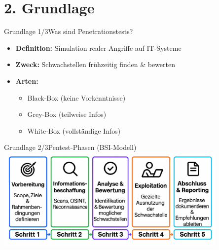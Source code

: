 \documentclass[
	aspectratio=169,	%
	onlytextwidth,		%
	t,					%
	]{beamer}
\begin{document}
\section{2. Grundlage}
\begin{frame}{Grundlage 1/3}{Was sind Penetrationstests?}
	\begin{itemize}
		\item \textbf{Definition:} Simulation realer Angriffe auf IT-Systeme
		
		\vspace{2mm}
		\item \textbf{Zweck:} Schwachstellen frühzeitig finden \&  bewerten
		\vspace{2mm}
		\item \textbf{Arten:}
		\begin{itemize}
			\item Black-Box (keine Vorkenntnisse)
			\item Grey-Box (teilweise Infos)
			\item White-Box (vollständige Infos)
		\end{itemize}
	\end{itemize}
\end{frame}


\begin{frame}{Grundlage 2/3}{Pentest-Phasen (BSI-Modell)}
	\centering
	\includegraphics[width=0.85\textwidth]{figures/Phase.png}
	\label{fig:phase}
\end{frame}
\end{document}

